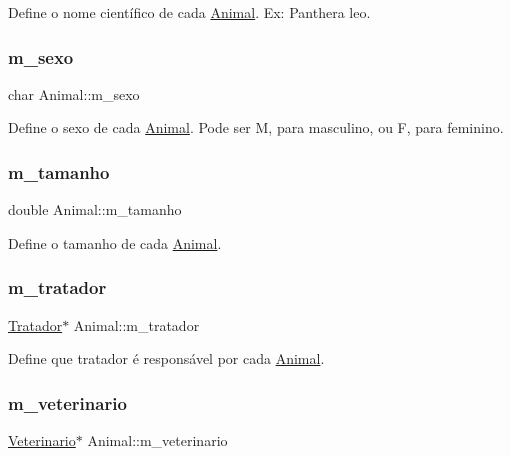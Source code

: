 Define o nome científico de cada \hyperlink{classAnimal}{Animal}. Ex\+: Panthera leo. \mbox{\label{classAnimal_aaa6d77e661ed0fa9a33500588c8acfef}} 
\subsubsection{\texorpdfstring{m\+\_\+sexo}{m\_sexo}}
{\footnotesize\ttfamily char Animal\+::m\+\_\+sexo\hspace{0.3cm}{\ttfamily [protected]}}

Define o sexo de cada \hyperlink{classAnimal}{Animal}. Pode ser M, para masculino, ou F, para feminino. \mbox{\label{classAnimal_afe83ba40e79b42d06b0c95f61aaa0218}} 
\subsubsection{\texorpdfstring{m\+\_\+tamanho}{m\_tamanho}}
{\footnotesize\ttfamily double Animal\+::m\+\_\+tamanho\hspace{0.3cm}{\ttfamily [protected]}}

Define o tamanho de cada \hyperlink{classAnimal}{Animal}. \mbox{\label{classAnimal_a1d9b76d126f6d72374f94d4d359e0ea7}} 
\subsubsection{\texorpdfstring{m\+\_\+tratador}{m\_tratador}}
{\footnotesize\ttfamily \hyperlink{classTratador}{Tratador}$\ast$ Animal\+::m\+\_\+tratador\hspace{0.3cm}{\ttfamily [protected]}}

Define que tratador é responsável por cada \hyperlink{classAnimal}{Animal}. \mbox{\label{classAnimal_a3b95df9484483642a10cafcafc15961d}} 
\subsubsection{\texorpdfstring{m\+\_\+veterinario}{m\_veterinario}}
{\footnotesize\ttfamily \hyperlink{classVeterinario}{Veterinario}$\ast$ Animal\+::m\+\_\+veterinario\hspace{0.3cm}{\ttfamily [protected]}}

